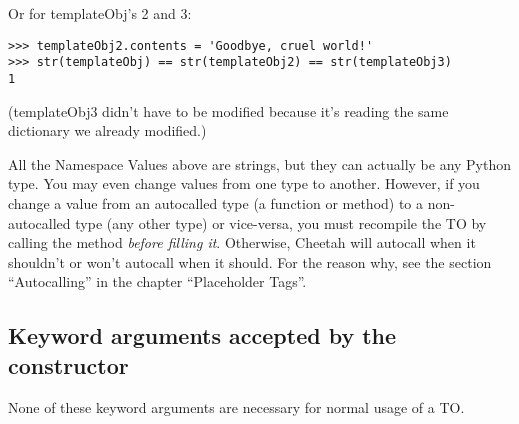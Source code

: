 Or for templateObj's 2 and 3:

\begin{verbatim}
>>> templateObj2.contents = 'Goodbye, cruel world!'
>>> str(templateObj) == str(templateObj2) == str(templateObj3)
1
\end{verbatim}

(templateObj3 didn't have to be modified because it's reading the same
 dictionary we already modified.)

All the Namespace Values above are strings, but they can actually be any Python
type.  You may even change values from one type to another.  However, if you
change a value from an autocalled type (a function or method) to a
non-autocalled type (any other type) or vice-versa, you must recompile the
TO by calling the  method {\em before filling it}.
Otherwise, Cheetah will autocall when it shouldn't or
won't autocall when it should.  For the reason why, see the section
``Autocalling'' in the chapter ``Placeholder Tags''.



\subsection{Keyword arguments accepted by the constructor}

None of these keyword arguments are necessary for normal usage of a TO.

